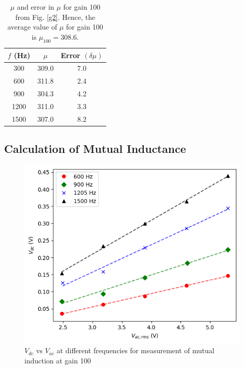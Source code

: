 \begin{table}[H]
    \centering
    \begin{tabular}{|c|c|c|} \hline
        $f$ (Hz) &   $\mu$ & Error $(\delta \mu)$ \\\hline
        300 &   309.0   &              7.0   \\
        600 &   311.8 &              2.4 \\
        900 &   304.3 &              4.2 \\
       1200 &   311.0   &              3.3 \\
       1500 &   307.0   &              8.2 \\ \hline   
    \end{tabular}
    \caption{$\mu$ and error in $\mu$ for gain 100 from Fig. \ref{g2}. Hence, the average value of $\mu$ for gain 100 is ${ \mu_{100} = 308.6}$.}
\end{table}

\subsection{Calculation of Mutual Inductance}



\begin{figure}[H]
    \centering
    \includegraphics[width=1\columnwidth]{images/e1.png}
    \caption{$V_{dc}$ vs $V_{ac}$ at different frequencies for measurement of mutual induction at gain 100}
    \label{g3}
\end{figure}

